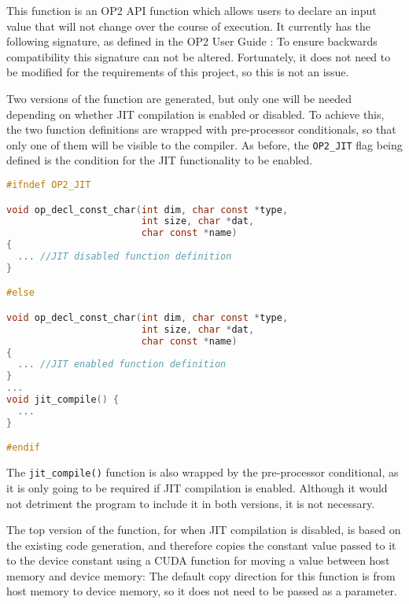 This function is an OP2 API function which allows users to declare an input value that will not change over the course of execution. It currently has the following signature, as defined in the OP2 User Guide \cite[p9]{manual}:
To ensure backwards compatibility this signature can not be altered. Fortunately, it does not need to be modified for the requirements of this project, so this is not an issue.
\par
Two versions of the function are generated, but only one will be needed depending on whether JIT compilation is enabled or disabled. To achieve this, the two function definitions are wrapped with pre-processor conditionals, so that only one of them will be visible to the compiler. As before, the \verb|OP2_JIT| flag being defined is the condition for the JIT functionality to be enabled.
\begin{lstlisting}[backgroundcolor=\color{red!20}, language=C]
#ifndef OP2_JIT

void op_decl_const_char(int dim, char const *type,
                        int size, char *dat,
                        char const *name)
{
  ... //JIT disabled function definition
}

#else

void op_decl_const_char(int dim, char const *type,
                        int size, char *dat,
                        char const *name)
{
  ... //JIT enabled function definition
}
...
void jit_compile() {
  ...
}

#endif
\end{lstlisting}
The \verb|jit_compile()| function is also wrapped by the pre-processor conditional, as it is only going to be required if JIT compilation is enabled. Although it would not detriment the program to include it in both versions, it is not necessary.

 The top version of the function, for when JIT compilation is disabled, is based on the existing code generation, and therefore copies the constant value passed to it to the device constant using a CUDA function for moving a value between host memory and device memory:
\noindent The default copy direction for this function is from host memory to device memory, so it does not need to be passed as a parameter.

